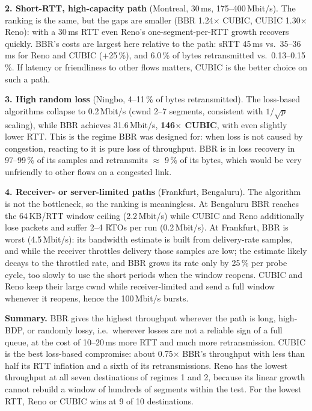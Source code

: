 \documentclass[10pt]{article}
\begin{document}
\textbf{2. Short-RTT, high-capacity path} (Montreal, 30\,ms, 175--400\,Mbit/s). The ranking is the same, but the gaps are smaller (BBR 1.24$\times$ CUBIC, CUBIC 1.30$\times$ Reno): with a 30\,ms RTT even Reno's one-segment-per-RTT growth recovers quickly. BBR's costs are largest here relative to the path: sRTT 45\,ms vs.\ 35--36\,ms for Reno and CUBIC (+25\,\%), and 6.0\,\% of bytes retransmitted vs.\ 0.13--0.15\,\%. If latency or friendliness to other flows matters, CUBIC is the better choice on such a path.

\textbf{3. High random loss} (Ningbo, 4--11\,\% of bytes retransmitted). The loss-based algorithms collapse to 0.2\,Mbit/s (cwnd 2--7 segments, consistent with $1/\sqrt{p}$ scaling), while BBR achieves 31.6\,Mbit/s, \textbf{146$\times$ CUBIC}, with even slightly lower RTT. This is the regime BBR was designed for: when loss is not caused by congestion, reacting to it is pure loss of throughput. BBR is in loss recovery in 97--99\,\% of its samples and retransmits $\approx$ 9\,\% of its bytes, which would be very unfriendly to other flows on a congested link.

\textbf{4. Receiver- or server-limited paths} (Frankfurt, Bengaluru). The algorithm is not the bottleneck, so the ranking is meaningless. At Bengaluru BBR reaches the 64\,KB/RTT window ceiling (2.2\,Mbit/s) while CUBIC and Reno additionally lose packets and suffer 2--4 RTOs per run (0.2\,Mbit/s). At Frankfurt, BBR is worst (4.5\,Mbit/s): its bandwidth estimate is built from delivery-rate samples, and while the receiver throttles delivery those samples are low; the estimate likely decays to the throttled rate, and BBR grows its rate only by 25\,\% per probe cycle, too slowly to use the short periods when the window reopens. CUBIC and Reno keep their large cwnd while receiver-limited and send a full window whenever it reopens, hence the 100\,Mbit/s bursts.

\textbf{Summary.} BBR gives the highest throughput wherever the path is long, high-BDP, or randomly lossy, i.e.\ wherever losses are not a reliable sign of a full queue, at the cost of 10--20\,ms more RTT and much more retransmission. CUBIC is the best loss-based compromise: about 0.75$\times$ BBR's throughput with less than half its RTT inflation and a sixth of its retransmissions. Reno has the lowest throughput at all seven destinations of regimes 1 and 2, because its linear growth cannot rebuild a window of hundreds of segments within the test. For the lowest RTT, Reno or CUBIC wins at 9 of 10 destinations.
\end{document}
